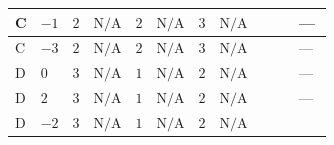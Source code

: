 \documentclass[8pt]{article}
\begin{document}
\begin{landscape}
\begin{longtable}{@{}llcccccc >{\raggedright\arraybackslash}p{0.21\linewidth} >{\raggedright\arraybackslash}p{0.21\linewidth} >{\raggedright\arraybackslash}p{0.21\linewidth}@{}}
\midrule
C & $-1$ & $2$ & $\text{N/A}$ & $2$ & $\text{N/A}$ & $3$ & $\text{N/A}$ & \scriptsize\adjustbox{max width=\linewidth}{$\begin{gathered} +4 {\lambda_{HS_1}^{(1)}} {\lambda_5}\end{gathered}$} & \scriptsize\adjustbox{max width=\linewidth}{$\begin{gathered} +4 {\lambda_{HS_2}^{(1)}} {\lambda_5}\end{gathered}$} & --- \\
\midrule
C & $-3$ & $2$ & $\text{N/A}$ & $2$ & $\text{N/A}$ & $3$ & $\text{N/A}$ & \scriptsize\adjustbox{max width=\linewidth}{$\begin{gathered} +4 {\lambda_{HS_1}^{(1)}} {\lambda_5}\end{gathered}$} & \scriptsize\adjustbox{max width=\linewidth}{$\begin{gathered} +4 {\lambda_{HS_2}^{(1)}} {\lambda_5}\end{gathered}$} & --- \\
\midrule
D & $0$ & $3$ & $\text{N/A}$ & $1$ & $\text{N/A}$ & $2$ & $\text{N/A}$ & \scriptsize\adjustbox{max width=\linewidth}{$\begin{gathered} +4 {\lambda_{HS_1}^{(1)}} {\lambda_5}\end{gathered}$} & \scriptsize\adjustbox{max width=\linewidth}{$\begin{gathered} +4 {\lambda_{HS_2}^{(1)}} {\lambda_5}\end{gathered}$} & --- \\
\midrule
D & $2$ & $3$ & $\text{N/A}$ & $1$ & $\text{N/A}$ & $2$ & $\text{N/A}$ & \scriptsize\adjustbox{max width=\linewidth}{$\begin{gathered} +4 {\lambda_{HS_1}^{(1)}} {\lambda_5}\end{gathered}$} & \scriptsize\adjustbox{max width=\linewidth}{$\begin{gathered} +4 {\lambda_{HS_2}^{(1)}} {\lambda_5}\end{gathered}$} & --- \\
\midrule
D & $-2$ & $3$ & $\text{N/A}$ & $1$ & $\text{N/A}$ & $2$ & $\text{N/A}$ & \scriptsize\adjustbox{max width=\linewidth}{$\begin{gathered} +4 {\lambda_{HS_1}^{(1)}} {\lambda_5}\end{gathered}$} & \scriptsize\adjustbox{max width=\linewidth}{$\begin{gathered} +4 {\lambda_{HS_2}^{(1)}} {\lambda_5}\end{gathered}$} & \scriptsize\adjustbox{max width=\linewidth}{$\begin{gathered} +4 {\lambda_{X_{7}}^{(1)}} \left({\lambda_{X_{12}}}\right)^{*}\end{gathered}$} \\

\end{longtable}
\end{landscape}
\end{document}
